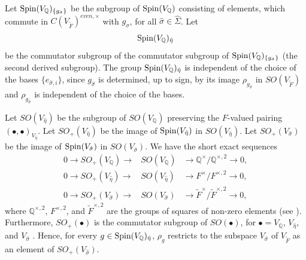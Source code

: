 \documentclass[12pt]{amsart}
\numberwithin{equation}{subsection}
\theoremstyle{plain}
\theoremstyle{definition}
\newcommand{\QQ}{{\mathbb Q}}
\newcommand{\Spin}{{\rm Spin}}
\begin{document}
{Let $\Spin(V_\QQ)_{\{g_{\hat{\sigma}}\}}$ be the subgroup 
of $\Spin(V_\QQ)$ consisting of elements, which commute in $C(V_{\tilde{F}})^{even,\times}$ with $g_{\hat{\sigma}}$, for all $\hat{\sigma}\in\hat{\Sigma}$.
Let
\begin{equation}
\label{eq-Spin-V-QQ-hat-eta}
\Spin(V_\QQ)_{\hat{\eta}}
\end{equation}
be the commutator subgroup of the commutator subgroup of $\Spin(V_\QQ)_{\{g_{\hat{\sigma}}\}}$ (the second derived subgroup).
The group $\Spin(V_\QQ)_{\hat{\eta}}$ is independent of the choice of the bases $\{e_{\hat{\sigma},i}\}$,
since $g_{\hat{\sigma}}$ is determined, up to sign,  by its image $\rho_{g_{\hat{\sigma}}}$ in $SO(V_{\tilde{F}})$ and $\rho_{g_{\hat{\sigma}}}$ is independent of the choice of the bases. 

Let $SO(V_{\hat{\eta}})$ be the subgroup of $SO(V_\QQ)$ preserving the $F$-valued pairing $(\bullet,\bullet)_{V_{\hat{\eta}}}.$ 
Let  $SO_+(V_{\hat{\eta}})$  be the image of $\Spin(V_{\hat{\eta}})$ in $SO(V_{\hat{\eta}})$.
Let $SO_+(V_{\hat{\sigma}})$ be the image of $\Spin(V_{\hat{\sigma}})$ in $SO(V_{\hat{\sigma}})$. We have the short exact sequences
\begin{eqnarray*}
0\rightarrow SO_+(V_\QQ)\rightarrow &SO(V_\QQ)&\rightarrow \QQ^\times/\QQ^{\times,2}\rightarrow 0,
\\
0\rightarrow SO_+(V_{\hat{\eta}})\rightarrow &SO(V_{\hat{\eta}})&\rightarrow F^\times/F^{\times,2}\rightarrow 0,
\\
0\rightarrow SO_+(V_{\hat{\sigma}})\rightarrow &SO(V_{\hat{\sigma}})&\rightarrow \tilde{F}^\times/\tilde{F}^{\times,2}\rightarrow 0,
\end{eqnarray*}
where $\QQ^{\times,2}$, $F^{\times,2}$, and $\tilde{F}^{\times,2}$ are the groups of squares of non-zero elements 
(see \cite[II.3.7]{chevalley}). Furthermore, $SO_+(\bullet)$ is the commutator subgroup of $SO(\bullet)$, for $\bullet=V_\QQ$, $V_{\hat{\eta}}$, and $V_{\hat{\sigma}}$ \cite[II.3.9]{chevalley}. 
Hence, for every $g\in \Spin(V_\QQ)_{\hat{\eta}}$, $\rho_g$ restricts to the subspace $V_{\hat{\sigma}}$ of $V_{\tilde{F}}$ 
as an element of $SO_+(V_{\hat{\sigma}})$.


}
\end{document}

